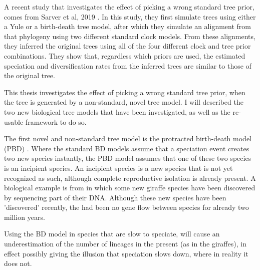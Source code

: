 A recent study that investigates the effect of picking
a wrong standard tree prior, comes from Sarver et al, 2019 \cite{sarver2019choice}.
In this study, they first simulate trees using either a Yule or a birth-death
tree model, after which they simulate an alignment from that phylogeny
using two different standard clock models. From these alignments, 
they inferred the original trees using all of the four 
different clock and tree prior combinations. 
They show that, regardless which priors are used,
the estimated speciation and diversification rates 
from the inferred trees are similar to those of the original tree.

This thesis investigates the effect of picking a wrong standard
tree prior, when the tree is generated by a non-standard, novel tree model.
I will described the two new biological tree models that have been
investigated, as well as the re-usable framework to do so. 

The first novel and non-standard tree model is the protracted birth-death
model (PBD) \cite{etienne2012prolonging}.
Where the standard BD models assume that a speciation event creates
two new species instantly, the PBD model assumes that one of these two species
is an incipient species. An incipient species is a new species
that is not yet recognized as such, although complete reproductive
isolation is already present.
A biological example is from \cite{fennessy2013mitochondrial} in which
some new giraffe species have been discovered by sequencing
part of their DNA. Although these new species have been
'discovered' recently, the had been no gene flow between species
for already two million years.

Using the BD model in species that are slow to speciate, will cause
an underestimation of the number of lineages in the present (as in the
giraffes), in effect possibly giving the illusion that speciation 
slows down, where in reality it does not. 

